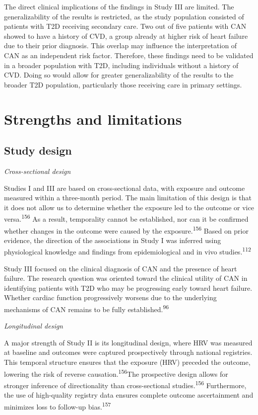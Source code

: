 \documentclass[
  a4paper,
  headsepline=true,
  open=left]{scrbook}
\begin{document}
The direct clinical implications of the findings in Study III are
limited. The generalizability of the results is restricted, as the study
population consisted of patients with T2D receiving secondary care. Two
out of five patients with CAN showed to have a history of CVD, a group
already at higher risk of heart failure due to their prior diagnosis.
This overlap may influence the interpretation of CAN as an independent
risk factor. Therefore, these findings need to be validated in a broader
population with T2D, including individuals without a history of CVD.
Doing so would allow for greater generalizability of the results to the
broader T2D population, particularly those receiving care in primary
settings.

\hypertarget{strengths-and-limitations}{%
\section{Strengths and limitations}\label{strengths-and-limitations}}

\hypertarget{study-design}{%
\subsection{Study design}\label{study-design}}

\emph{Cross-sectional design}

Studies I and III are based on cross-sectional data, with exposure and
outcome measured within a three-month period. The main limitation of
this design is that it does not allow us to determine whether the
exposure led to the outcome or vice versa.\textsuperscript{156} As a
result, temporality cannot be established, nor can it be confirmed
whether changes in the outcome were caused by the
exposure.\textsuperscript{156} Based on prior evidence, the direction of
the associations in Study I was inferred using physiological knowledge
and findings from epidemiological and in vivo
studies.\textsuperscript{112}

Study III focused on the clinical diagnosis of CAN and the presence of
heart failure. The research question was oriented toward the clinical
utility of CAN in identifying patients with T2D who may be progressing
early toward heart failure. Whether cardiac function progressively
worsens due to the underlying mechanisms of CAN remains to be fully
established.\textsuperscript{96}

\emph{Longitudinal design}

A major strength of Study II is its longitudinal design, where HRV was
measured at baseline and outcomes were captured prospectively through
national registries. This temporal structure ensures that the exposure
(HRV) preceded the outcome, lowering the risk of reverse
causation.\textsuperscript{156}The prospective design allows for
stronger inference of directionality than cross-sectional
studies.\textsuperscript{156} Furthermore, the use of high-quality
registry data ensures complete outcome ascertainment and minimizes loss
to follow-up bias.\textsuperscript{157}
\end{document}
